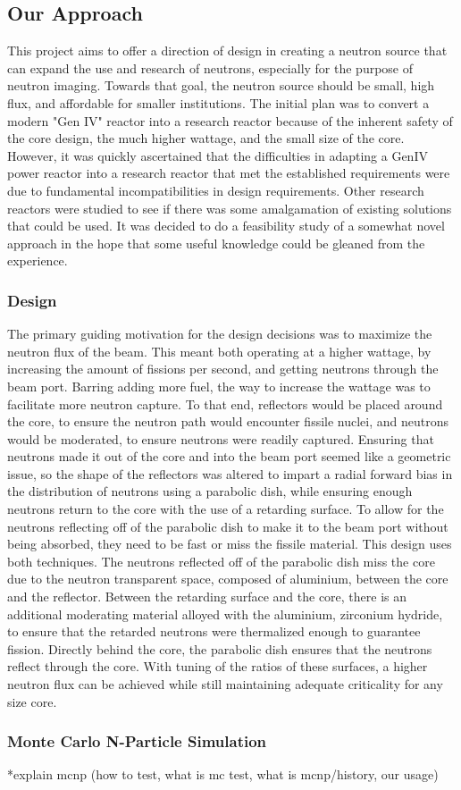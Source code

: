\subsection{Our Approach}
This project aims to offer a direction of design in creating a neutron source that can expand the use and research of neutrons, especially for the purpose of neutron imaging. Towards that goal, the neutron source should be small, high flux, and affordable for smaller institutions. The initial plan was to convert a modern "Gen IV" reactor into a research reactor because of the inherent safety of the core design, the much higher wattage, and the small size of the core. However, it was quickly ascertained that the difficulties in adapting a GenIV power reactor into a research reactor that met the established requirements were due to fundamental incompatibilities in design requirements. Other research reactors were studied to see if there was some amalgamation of existing solutions that could be used. It was decided to do a feasibility study of a somewhat novel approach in the hope that some useful knowledge could be gleaned from the experience.\\
\subsubsection{Design}
The primary guiding motivation for the design decisions was to maximize the neutron flux of the beam. This meant both operating at a higher wattage, by increasing the amount of fissions per second, and getting neutrons through the beam port. Barring adding more fuel, the way to increase the wattage was to facilitate more neutron capture. To that end, reflectors would be placed around the core, to ensure the neutron path would encounter fissile nuclei, and neutrons would be moderated, to ensure neutrons were readily captured. Ensuring that neutrons made it out of the core and into the beam port seemed like a geometric issue, so the shape of the reflectors was altered to impart a radial forward bias in the distribution of neutrons using a parabolic dish, while ensuring enough neutrons return to the core with the use of a retarding surface. To allow for the neutrons reflecting off of the parabolic dish to make it to the beam port without being absorbed, they need to be fast or miss the fissile material. This design uses both techniques. The neutrons reflected off of the parabolic dish miss the core due to the neutron transparent space, composed of aluminium, between the core and the reflector. Between the retarding surface and the core, there is an additional moderating material alloyed with the aluminium, zirconium hydride, to ensure that the retarded neutrons were thermalized enough to guarantee fission. Directly behind the core, the parabolic dish ensures that the neutrons reflect through the core. With tuning of the ratios of these surfaces, a higher neutron flux can be achieved while still maintaining adequate criticality for any size core.\\
\subsubsection{Monte Carlo N-Particle Simulation}
*explain mcnp (how to test, what is mc test, what is mcnp/history, our usage)\\
